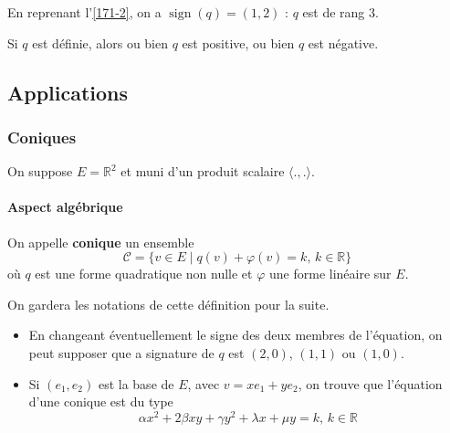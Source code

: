 	
	\begin{example}
		En reprenant l'\cref{171-2}, on a $\operatorname{sign}(q) = (1,2)$ : $q$ est de rang $3$.
	\end{example}
	
	\begin{proposition}
		Si $q$ est définie, alors ou bien $q$ est positive, ou bien $q$ est négative.
	\end{proposition}
	
	\subsection{Applications}
	
	\subsubsection{Coniques}
	
	
	On suppose $E = \mathbb{R}^2$ et muni d'un produit scalaire $\langle ., . \rangle$.
	
	\paragraph{Aspect algébrique}
	
	\begin{definition}
		On appelle \textbf{conique} un ensemble
		\[ \mathcal{C} = \{ v \in E \mid q(v) + \varphi(v) = k, \, k \in \mathbb{R} \} \]
		où $q$ est une forme quadratique non nulle et $\varphi$ une forme linéaire sur $E$.
	\end{definition}
	
	On gardera les notations de cette définition pour la suite.
	
	\begin{remark}
		\begin{itemize}
			\item En changeant éventuellement le signe des deux membres de l'équation, on peut supposer que a signature de $q$ est $(2,0)$, $(1,1)$ ou $(1,0)$.
			\item Si $(e_1, e_2)$ est la base de $E$, avec $v = xe_1 + ye_2$, on trouve que l'équation d'une conique est du type
			\[ \alpha x^2 + 2 \beta xy + \gamma y^2 + \lambda x + \mu y = k, \, k \in \mathbb{R} \]
		\end{itemize}
	\end{remark}
	
